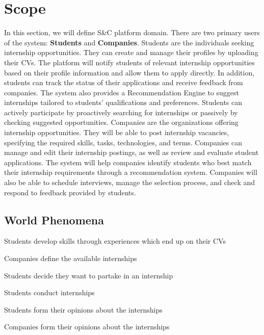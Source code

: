 \section{Scope }
In this section, we will define S\&C platform domain.\newline
There are two primary users of the system: \textbf{Students} and \textbf{Companies}.\newline
Students are the individuals seeking internship opportunities. They can create and manage their profiles by uploading their CVs. The platform will notify students of relevant internship opportunities based on their profile information and allow them to apply directly. In addition, students can track the status of their applications and receive feedback from companies. The system also provides a Recommendation Engine to suggest internships tailored to students' qualifications and preferences. Students can actively participate by proactively searching for internships or passively by checking suggested opportunities.\newline
Companies are the organizations offering internship opportunities. They will be able to post internship vacancies, specifying the required skills, tasks, technologies, and terms. Companies can manage and edit their internship postings, as well as review and evaluate student applications. The system will help companies identify students who best match their internship requirements through a recommendation system. Companies will also be able to schedule interviews, manage the selection process, and check and respond to feedback provided by students.

\subsection{World Phenomena }
\begin{enumerate}[label={[WP\arabic{enumi}]}]
    \item Students develop skills through experiences which end up on their CVs
    \item Companies define the available internships
    \item Students decide they want to partake in an internship
    \item Students conduct internships
    \item Students form their opinions about the internships
    \item Companies form their opinions about the internships
\end{enumerate}

